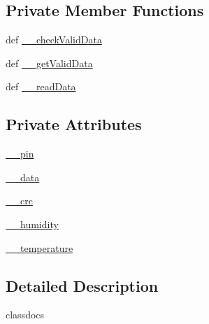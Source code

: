 \subsection*{Private Member Functions}
\begin{DoxyCompactItemize}
\item 
def \hyperlink{classlibsensorPy_1_1concretesensor_1_1dht11Temperature_1_1DHT11Temperature_adec17919d7fe391677e9e9117c8f52d3}{\+\_\+\+\_\+check\+Valid\+Data}
\item 
def \hyperlink{classlibsensorPy_1_1concretesensor_1_1dht11Temperature_1_1DHT11Temperature_a14ecdc4b2de19908a965db4058ac0210}{\+\_\+\+\_\+get\+Valid\+Data}
\item 
def \hyperlink{classlibsensorPy_1_1concretesensor_1_1dht11Temperature_1_1DHT11Temperature_a2dbd945dd49378436f1177b538a09459}{\+\_\+\+\_\+read\+Data}
\end{DoxyCompactItemize}
\subsection*{Private Attributes}
\begin{DoxyCompactItemize}
\item 
\hyperlink{classlibsensorPy_1_1concretesensor_1_1dht11Temperature_1_1DHT11Temperature_aaeafc0234ecde2ea71edb2cde10bcc72}{\+\_\+\+\_\+pin}
\item 
\hyperlink{classlibsensorPy_1_1concretesensor_1_1dht11Temperature_1_1DHT11Temperature_a2606abdcfef9329a6a8d8863e072a5f6}{\+\_\+\+\_\+data}
\item 
\hyperlink{classlibsensorPy_1_1concretesensor_1_1dht11Temperature_1_1DHT11Temperature_a02d1822cd5645d11e7fc18924f377ace}{\+\_\+\+\_\+crc}
\item 
\hyperlink{classlibsensorPy_1_1concretesensor_1_1dht11Temperature_1_1DHT11Temperature_a101af3374fcabaa6ba1a9ef670f1260b}{\+\_\+\+\_\+humidity}
\item 
\hyperlink{classlibsensorPy_1_1concretesensor_1_1dht11Temperature_1_1DHT11Temperature_aed45d0818f7f931b0b48176a0477e67a}{\+\_\+\+\_\+temperature}
\end{DoxyCompactItemize}


\subsection{Detailed Description}
\begin{DoxyVerb}classdocs
\end{DoxyVerb}
 

